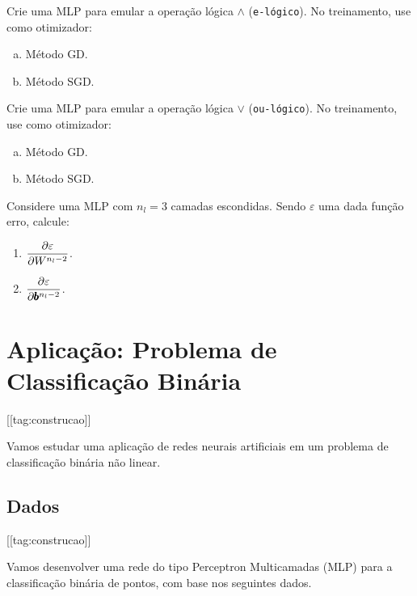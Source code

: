 \begin{exer}
  Crie uma MLP para emular a operação lógica $\land$ (\texttt{e-lógico}). No treinamento, use como otimizador:
  \begin{enumerate}[a)]
  \item Método GD.
  \item Método SGD.
  \end{enumerate}
\end{exer}

\begin{exer}
  Crie uma MLP para emular a operação lógica $\lor$ (\texttt{ou-lógico}). No treinamento, use como otimizador:
  \begin{enumerate}[a)]
  \item Método GD.
  \item Método SGD.
  \end{enumerate}
\end{exer}

\begin{exer}
  Considere uma MLP com $n_l=3$ camadas escondidas. Sendo $\varepsilon$ uma dada função erro, calcule:
  \begin{enumerate}
  \item $\displaystyle \frac{\partial\varepsilon}{\partial W^{n_l-2}}$.
  \item $\displaystyle \frac{\partial\varepsilon}{\partial \pmb{b}^{n_l-2}}$.
  \end{enumerate}
\end{exer}



\section{Aplicação: Problema de Classificação Binária}\label{cap_mlp_sec_classbin}

[[tag:construcao]]

Vamos estudar uma aplicação de redes neurais artificiais em um problema de classificação binária não linear.

\subsection{Dados}

[[tag:construcao]]

Vamos desenvolver uma rede do tipo Perceptron Multicamadas (MLP) para a classificação binária de pontos, com base nos seguintes dados.

